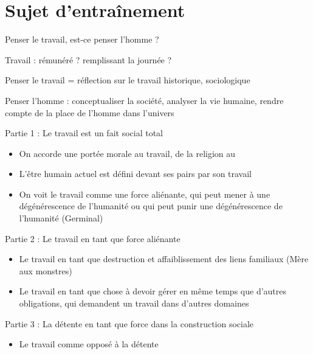 \documentclass[a4paper,12pt]{book}
\begin{document}
\section{Sujet d'entraînement}
Penser le travail, est-ce penser l'homme ?
\par Travail : rémunéré ? remplissant la journée ?
\par Penser le travail = réflection sur le travail historique, sociologique
\par Penser l'homme : conceptualiser la société, analyser la vie humaine, rendre compte de la place de l'homme dans l'univers
\par Partie 1 : Le travail est un fait social total\begin{itemize}
    \item On accorde une portée morale au travail, de la religion au 
    \item L'être humain actuel est défini devant ses pairs par son travail
    \item On voit le travail comme une force aliénante, qui peut mener à une dégénérescence de l'humanité ou qui peut punir une dégénérescence de l'humanité (Germinal)
\end{itemize}
\par Partie 2 : Le travail en tant que force aliénante \begin{itemize}
    \item Le travail en tant que destruction et affaiblissement des liens familiaux (Mère aux monstres)
    \item Le travail en tant que chose à devoir gérer en même temps que d'autres obligations, qui demandent un travail dans d'autres domaines
\end{itemize}
\par Partie 3 : La détente en tant que force dans la construction sociale\begin{itemize}
    \item Le travail comme opposé à la détente
\end{itemize}
\end{document}
